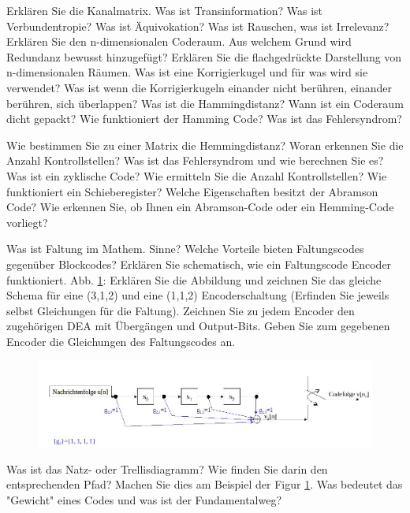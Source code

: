 \documentclass[ngerman,a4paper,12pt]{scrreprt}
\begin{document}
\olR
	\li Erklären Sie die Kanalmatrix.
	\li Was ist Transinformation?
	\li Was ist Verbundentropie?
	\li Was ist Äquivokation?
	\li Was ist Rauschen, was ist Irrelevanz?
	\li Erklären Sie den n-dimensionalen Coderaum.
	\li Aus welchem Grund wird Redundanz bewusst hinzugefügt?
	\li Erklären Sie die flachgedrückte Darstellung von n-dimensionalen Räumen.
	\li Was ist eine Korrigierkugel und für was wird sie verwendet? Was ist wenn die Korrigierkugeln einander nicht berühren, einander berühren, sich überlappen?
	\li Was ist die Hammingdistanz?
	\li Wann ist ein Coderaum dicht gepackt?
	\li Wie funktioniert der Hamming Code?
	\li Was ist das Fehlersyndrom?
\olS


\olR
	\li Wie bestimmen Sie zu einer Matrix die Hemmingdistanz?
	\li Woran erkennen Sie die Anzahl Kontrollstellen?
	\li Was ist das Fehlersyndrom und wie berechnen Sie es?
	\li Was ist ein zyklische Code? Wie ermitteln Sie die Anzahl Kontrollstellen?
	\li Wie funktioniert ein Schieberegister?
	\li Welche Eigenschaften besitzt der Abramson Code? Wie erkennen Sie, ob Ihnen ein Abramson-Code oder ein Hemming-Code vorliegt?
\olS


\olR
	\li Was ist Faltung im Mathem. Sinne?
	\li Welche Vorteile bieten Faltungscodes gegenüber Blockcodes?
	\li Erklären Sie schematisch, wie ein Faltungscode Encoder funktioniert.
	\li Abb. \ref{encs}: Erklären Sie die Abbildung und zeichnen Sie das gleiche Schema für eine (3,1,2) und eine (1,1,2) Encoderschaltung (Erfinden Sie jeweils selbst Gleichungen für die Faltung). Zeichnen Sie zu jedem Encoder den zugehörigen DEA mit Übergängen und Output-Bits. Geben Sie zum gegebenen Encoder die Gleichungen des Faltungscodes an.
	\begin{figure}[H]
		\centering
		\includegraphics[width=\textwidth]{img/R7.1.jpg}
		\caption{}
		\label{encs}
	\end{figure}
	\li Was ist das Natz- oder Trellisdiagramm? Wie finden Sie darin den entsprechenden Pfad? Machen Sie dies am Beispiel der Figur \ref{encs}.
	\li Was bedeutet das "Gewicht" eines Codes und was ist der Fundamentalweg?
\olS
\end{document}
